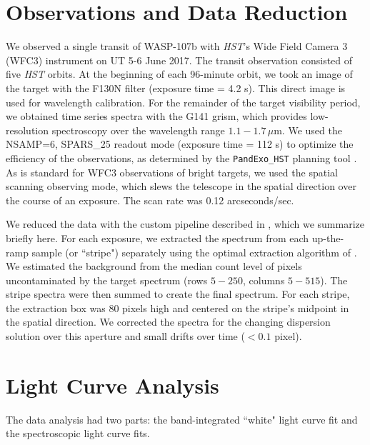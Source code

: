 \documentclass[twocolumn, trackchanges]{aastex61}
\begin{document}
\section{Observations and Data Reduction}
We observed a single transit of WASP-107b with \emph{HST}'s Wide Field Camera 3 (WFC3) instrument on UT 5-6 June 2017.  The transit observation consisted of five \emph{HST} orbits. At the beginning of each 96-minute orbit, we took an image of the target with the F130N filter (exposure time = 4.2 s). This direct image is used for wavelength calibration. For the remainder of the target visibility period, we obtained time series spectra with the G141 grism, which provides low-resolution spectroscopy over the wavelength range $1.1 - 1.7\,\mu$m.  We used the NSAMP=6, SPARS\_25 readout mode (exposure time = 112 s) to optimize the efficiency of the observations, as determined by the \texttt{PandExo\_HST} planning tool \citep{batalha17}.  As is standard for WFC3 observations of bright targets, we used the spatial scanning observing mode, which slews the telescope in the spatial direction over the course of an exposure. The scan rate was 0.12 arcseconds/sec.

We reduced the data with the custom pipeline described in \cite{kreidberg14a}, which we summarize briefly here. For each exposure, we extracted the spectrum from each up-the-ramp sample (or ``stripe") separately using the optimal extraction algorithm of \cite{horne86}. We estimated the background from the median count level of pixels uncontaminated by the target spectrum (rows $5-250$, columns $5-515$).  The stripe spectra were then summed to create the final spectrum. For each stripe, the extraction box was 80 pixels high and centered on the stripe's midpoint in the spatial direction. We corrected the spectra for the changing dispersion solution over this aperture and small drifts over time ($<0.1$ pixel).  

\section{Light Curve Analysis}
The data analysis had two parts: the band-integrated ``white" light curve fit and the spectroscopic light curve fits.
\end{document}
